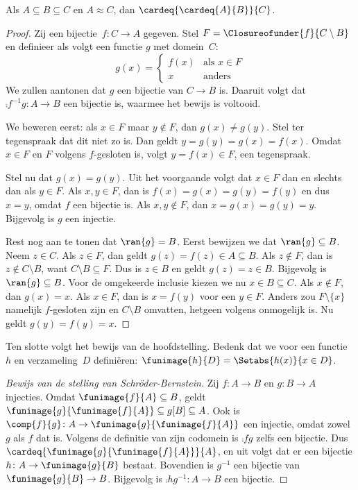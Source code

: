 \documentclass[../../../include/open-logic-section]{subfiles}
\begin{document}
\begin{prop}
Als $A \subseteq B \subseteq C$ en $A \approx C$, dan $\cardeq{\cardeq{A}{B}}{C}$.
\end{prop}

\begin{proof}
Zij een bijectie~$f \colon C \to A$ gegeven. Stel $F =
\Closureofunder{f}{C \setminus B}$ en definieer als volgt een functie
$g$ met domein~$C$:
\[
	g(x) =
	\begin{cases}
			f(x) &\text{als $x \in F$}\\
			x & \text{anders}
		\end{cases}
\]
We zullen aantonen dat $g$ een bijectie van $C \to B$ is. Daaruit
volgt dat $\comp{f^{-1}}{g} \colon A \to B$ een bijectie is, waarmee
het bewijs is voltooid.

We beweren eerst: als $x \in F$ maar $y\notin F$, dan $g(x) \neq
g(y)$. Stel ter tegenspraak dat dit niet zo is. Dan geldt $y = g(y) = g(x) =
f(x)$. Omdat $x \in F$ en $F$ volgens 
$f$-gesloten is, volgt $y = f(x) \in F$, een tegenspraak.

Stel nu dat $g(x) = g(y)$. Uit het voorgaande volgt dat $x \in F$ dan
en slechts dan als $y \in F$. Als $x, y \in F$, dan is $f(x) = g (x)
= g(y) = f(y)$ en dus $x = y$, omdat $f$ een bijectie is. Als
$x, y \notin F$, dan $x = g(x) = g(y) = y$. Bijgevolg is $g$ een
injectie.

Rest nog aan te tonen dat $\ran{g} = B$. Eerst bewijzen we dat
$\ran{g} \subseteq B$. Neem $z \in C$. Als $z \in F$, dan geldt
$g(z) = f(z) \in A \subseteq B$. Als $z \notin F$, dan is
$z \notin C \setminus B$, want $C \setminus B \subseteq F$. Dus is
$z \in B$ en geldt $g(z) = z \in B$. Bijgevolg is
$\ran{g} \subseteq B$. Voor de omgekeerde inclusie kiezen we nu
$x \in B \subseteq C$. Als
$x \notin F$, dan $g(x) = x$. Als $x \in F$, dan is $x = f(y)$ voor
een $y \in F$. Anders zou $F \setminus \{x\}$ namelijk $f$-gesloten
zijn en $C\setminus B$ omvatten, hetgeen volgens 
onmogelijk is. Nu geldt $g(y) = f(y) = x$.
\end{proof}

Ten slotte volgt het bewijs van de hoofdstelling. Bedenk dat we voor een
functie~$h$ en verzameling~$D$ definiëren: $\funimage{h}{D} =
\Setabs{h(x)}{x \in D}$.

\begin{proof}[Bewijs van de stelling van Schr\"oder-Bernstein] Zij $f
\colon A \to B$ en $g \colon B \to A$ injecties. Omdat
$\funimage{f}{A} \subseteq B$, geldt
$\funimage{g}{\funimage{f}{A}} \subseteq g[B] \subseteq A$. Ook is
$\comp{f}{g} \colon A \to \funimage{g}{\funimage{f}{A}}$ een
injectie, omdat zowel $g$ als $f$ dat is. Volgens de definitie van zijn
codomein is $\comp{f}{g}$ zelfs een bijectie. Dus
$\cardeq{\funimage{g}{\funimage{f}{A}}}{A}$, en uit
 volgt dat er een bijectie $h \colon A \to
\funimage{g}{B}$ bestaat. Bovendien is $g^{-1}$ een bijectie van
$\funimage{g}{B} \to B$. Bijgevolg is $\comp{h}{g^{-1}} \colon A \to
B$ een bijectie.
\end{proof}
\end{document}
